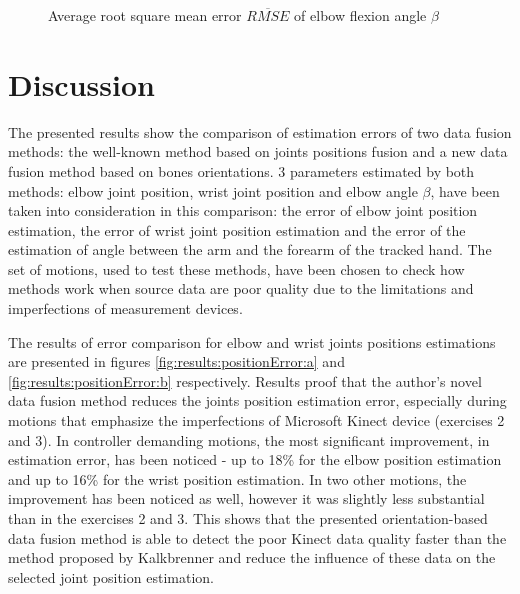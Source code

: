 \documentclass[sensors,article,submit,moreauthors,pdftex,10pt,a4paper]{mdpi}
\begin{document}
\begin{figure}[H]
	\centering
	
	\caption{Average root square mean error $\overline{RMSE}$ of elbow flexion angle $\beta$}
	\label{fig:results:elbowAngleError}
\end{figure}

\section{Discussion}

The presented results show the comparison of estimation errors of two data fusion methods: the well-known method based on joints positions fusion and a new data fusion method based on bones orientations. 3 parameters estimated by both methods: elbow joint position, wrist joint position and elbow angle $\beta$, have been taken into consideration in this comparison: the error of elbow joint position estimation, the error of wrist joint position estimation and the error of the estimation of angle between the arm and the forearm of the tracked hand. The set of motions, used to test these methods, have been chosen to check how methods work when source data are poor quality due to the limitations and imperfections of measurement devices.

The results of error comparison for elbow and wrist joints positions estimations are presented in figures \ref{fig:results:positionError:a} and \ref{fig:results:positionError:b} respectively. Results proof that the author’s novel data fusion method reduces the joints position estimation error, especially during motions that emphasize the imperfections of Microsoft Kinect device (exercises 2 and 3). In controller demanding motions, the most significant improvement, in estimation error, has been noticed - up to 18\% for the elbow position estimation and up to 16\% for the wrist position estimation. In two other motions, the improvement has been noticed as well, however it was slightly less substantial than in the exercises 2 and 3. This shows that the presented orientation-based data fusion method is able to detect the poor Kinect data quality faster than the method proposed by Kalkbrenner and reduce the influence of these data on the selected joint position estimation. 
\end{document}
